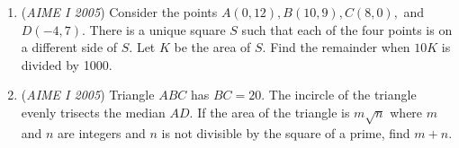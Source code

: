 \begin{enumerate}
\begin{enumerate}
        \item There are no right angle turns in the particle's path.
            \end{enumerate}
            How many different paths can the particle take from $(0,0)$ to $(5,5)$?


 

	\item (\textit{AIME I 2005}) Consider the points $A(0,12), B(10,9), C(8,0),$ and $D(-4,7).$ There is a unique square $S$ such that each of the four points is on a different side of $S.$ Let $K$ be the area of $S.$ Find the remainder when $10K$ is divided by 1000.


 

	\item (\textit{AIME I 2005}) Triangle $ABC$ has $BC=20.$ The incircle of the triangle evenly trisects the median $AD.$ If the area of the triangle is $m \sqrt{n}$ where $m$ and $n$ are integers and $n$ is not divisible by the square of a prime, find $m+n.$


\end{enumerate}